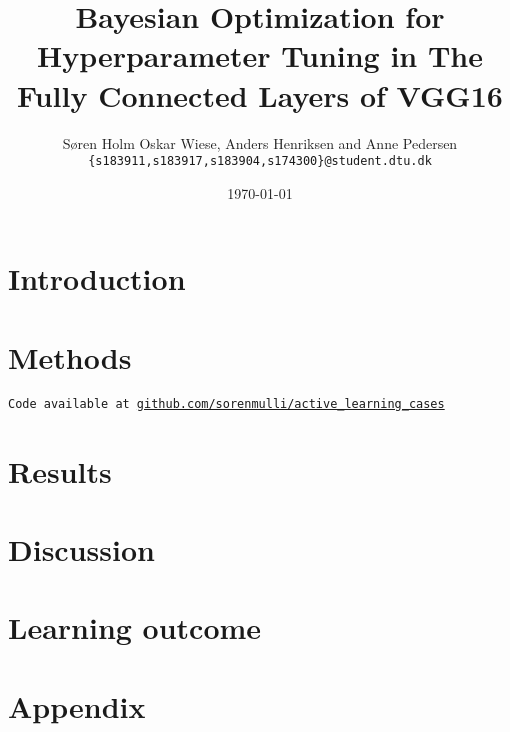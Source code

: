 \documentclass[12pt,fleqn]{article}
\title{\vspace*{-3.75cm}Bayesian Optimization for Hyperparameter Tuning in The Fully Connected Layers of VGG16}
\author{Søren Holm Oskar Wiese, Anders Henriksen and Anne Pedersen \\
	\small {\texttt{\{s183911,s183917,s183904,s174300\}@student.dtu.dk}}}
\date{\today}
\begin{document}
	
	\maketitle
	
	
	\begin{abstract}
		
	\end{abstract}
	
	\begin{multicols}{2}
		
		
		\section{Introduction} 
		

		\section{Methods}
			
			\texttt{Code available at \url{github.com/sorenmulli/active_learning_cases}}
		
		
	\end{multicols}

	\section{Results}
		
	
	\begin{multicols}{2}

		\section{Discussion}
			
		\section{Learning outcome}
			
	\end{multicols}
	
	\begin{thebibliography}{9}
		
	\end{thebibliography}
	
	\section{Appendix}
	
	
\end{document}
